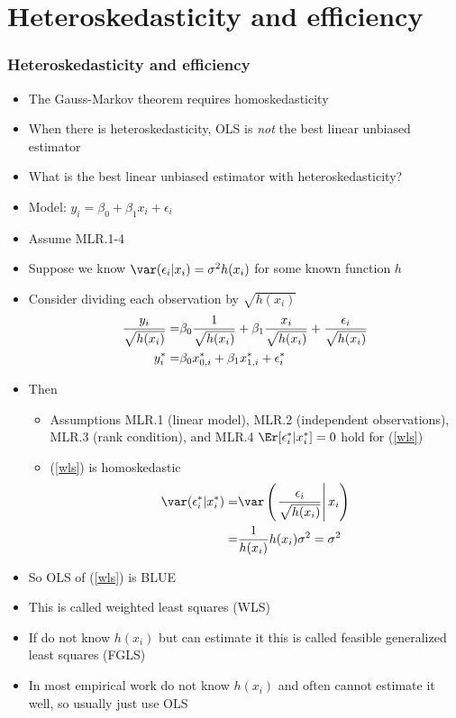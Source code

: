 
\section{Heteroskedasticity and efficiency}

\begin{frame}[allowframebreaks]\frametitle{Heteroskedasticity and
    efficiency}
  \begin{itemize}
  \item The Gauss-Markov theorem requires homoskedasticity
  \item When there is heteroskedasticity, OLS is \emph{not} the best
    linear unbiased estimator
  \item What is the best linear unbiased estimator with
    heteroskedasticity?
  \item Model: $y_i = \beta_0 + \beta_1 x_i + \epsilon_i $
  \item Assume MLR.1-4
  \item Suppose we know $\var(\epsilon_{i} | x_i ) = \sigma^2 h(x_i)$ for
    some known function $h$
  \item Consider dividing each observation by $\sqrt{h(x_i)}$
    \begin{align}
      \frac{y_i}{\sqrt{h(x_i)}} = & \beta_0\frac{1}{\sqrt{h(x_i)}} +
      \beta_1 \frac{x_i}{\sqrt{h(x_i)}} +
      \frac{\epsilon_i}{\sqrt{h(x_i)}} \notag \\
      y_i^* = & \beta_0 x_{0,i}^* + \beta_1 x_{1,i}^* + \epsilon_i^*  \label{wls}
    \end{align}
  \item Then 
    \begin{itemize}
    \item Assumptions MLR.1 (linear model), MLR.2 (independent
      observations), MLR.3 (rank condition), and MLR.4
      $\Er[\epsilon_i^* | x_i^*] = 0$ hold for (\ref{wls})
    \item (\ref{wls}) is homoskedastic
      \begin{align*}
        \var(\epsilon_i^* | x_i^*) = & \var\left(\left.
            \frac{\epsilon_i}{\sqrt{h(x_i)}} \right| x_i \right) \\
        = & \frac{1}{h(x_i) } h(x_i) \sigma^2 = \sigma^2
      \end{align*}
    \end{itemize}
  \item So OLS of (\ref{wls}) is BLUE
  \item This is called \alert{weighted least squares} (WLS) 
  \item If do not know $h(x_i)$ but can estimate it this is called
    \alert{feasible generalized least squares} (FGLS) 
  \item In most empirical work do not know $h(x_i)$ and often cannot
    estimate it well, so usually just use OLS
  \end{itemize}  
\end{frame}


